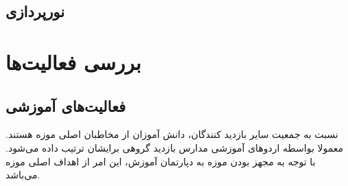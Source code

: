 \subsection*{نورپردازی}



\section*{بررسی فعالیت‌ها}

\subsection*{فعالیت‌های آموزشی}
نسبت به جمعیت سایر بازدید کنندگان، دانش آموزان از مخاطبان اصلی موزه هستند. معمولا بواسطه اردوهای آموزشی مدارس بازدید گروهی برایشان ترتیب داده می‌شود.
با توجه به مجهز بودن موزه به دپارتمان آموزش، این امر از اهداف اصلی موزه می‌باشد. 




